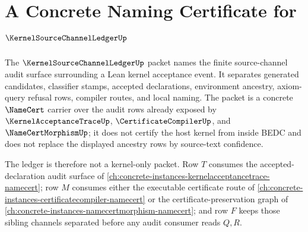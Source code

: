 \chapter{A Concrete Naming Certificate for $\KernelSourceChannelLedgerUp$}
\label{ch:concrete-instances-kernelsourcechannelledger-namecert}

The $\KernelSourceChannelLedgerUp$ packet names the finite source-channel audit surface surrounding a Lean kernel acceptance event. It separates generated candidates, classifier stamps, accepted declarations, environment ancestry, axiom-query refusal rows, compiler routes, and local naming. The packet is a concrete $\NameCert$ carrier over the audit rows already exposed by $\KernelAcceptanceTraceUp$, $\CertificateCompilerUp$, and $\NameCertMorphismUp$; it does not certify the host kernel from inside BEDC and does not replace the displayed ancestry rows by source-text confidence.

The ledger is therefore not a kernel-only packet. Row $T$ consumes the accepted-declaration audit surface of \autoref{ch:concrete-instances-kernelacceptancetrace-namecert}; row $M$ consumes either the executable certificate route of \autoref{ch:concrete-instances-certificatecompiler-namecert} or the certificate-preservation graph of \autoref{ch:concrete-instances-namecertmorphism-namecert}; and row $F$ keeps those sibling channels separated before any audit consumer reads $Q,R$.

